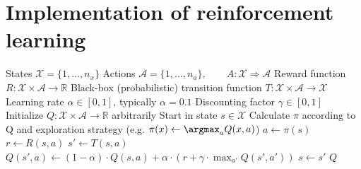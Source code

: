 \section{Implementation of reinforcement learning}
\begin{preview}
    \begin{algorithm}[H]
        \begin{algorithmic}
        \Require
        \Statex States $\mathcal{X} = \{1, \dots, n_x\}$
        \Statex Actions $\mathcal{A} = \{1, \dots, n_a\},\qquad A: \mathcal{X} \Rightarrow \mathcal{A}$
        \Statex Reward function $R: \mathcal{X} \times \mathcal{A} \rightarrow \mathbb{R}$
        \Statex Black-box (probabilistic) transition function $T: \mathcal{X} \times \mathcal{A} \rightarrow \mathcal{X}$
        \Statex Learning rate $\alpha \in [0, 1]$, typically $\alpha = 0.1$
        \Statex Discounting factor $\gamma \in [0, 1]$
            \State Initialize $Q: \mathcal{X} \times \mathcal{A} \rightarrow \mathbb{R}$ arbitrarily
                \State Start in state $s \in \mathcal{X}$
                    \State Calculate $\pi$ according to Q and exploration strategy (e.g. $\pi(x) \gets \argmax_{a} Q(x, a)$)
                    \State $a \gets \pi(s)$
                    \State $r \gets R(s, a)$ 
                    \State $s' \gets T(s, a)$ 
                    \State $Q(s', a) \gets (1 - \alpha) \cdot Q(s, a) + \alpha \cdot (r + \gamma \cdot \max_{a'} Q(s', a'))$
                    \State $s \gets s'$
                \EndWhile
            \EndWhile
            \Return $Q$
        \EndProcedure
        \end{algorithmic}
    \caption{$Q$-learning: Learn function $Q: \mathcal{X} \times \mathcal{A} \rightarrow \mathbb{R}$}
    \label{alg:q-learning}
    \end{algorithm}
    \end{preview}